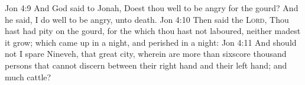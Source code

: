 \vs Jon 4:9 And God said to Jonah, Doest thou well to be angry for the gourd? And he said, I do well to be angry,  unto death.
\vs Jon 4:10 Then said the \textsc{Lord}, Thou hast had pity on the gourd, for the which thou hast not laboured, neither madest it grow; which came up in a night, and perished in a night:
\vs Jon 4:11 And should not I spare Nineveh, that great city, wherein are more than sixscore thousand persons that cannot discern between their right hand and their left hand; and  much cattle?
